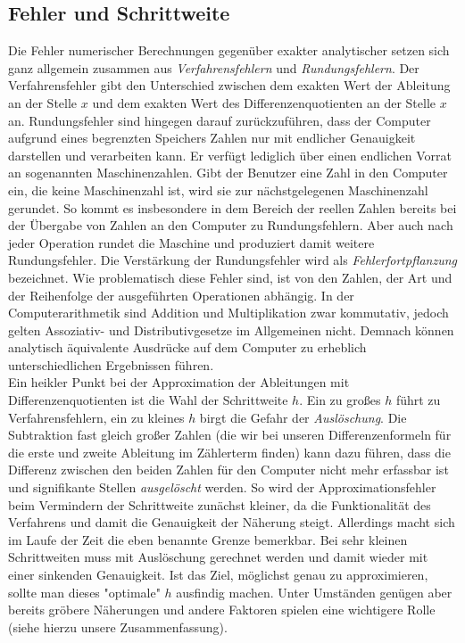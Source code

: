 \documentclass{scrartcl}
\begin{document}
\subsection{Fehler und Schrittweite}
\label{ssec:schrittweite}
Die Fehler numerischer Berechnungen gegenüber exakter analytischer setzen sich ganz allgemein zusammen aus \textit{Verfahrensfehlern} und \textit{Rundungsfehlern}. Der Verfahrensfehler gibt den Unterschied zwischen dem exakten Wert der Ableitung an der Stelle $x$ und dem exakten Wert des Differenzenquotienten an der Stelle $x$ an. Rundungsfehler sind hingegen darauf zurückzuführen, dass der Computer aufgrund eines begrenzten Speichers Zahlen nur mit endlicher Genauigkeit darstellen und verarbeiten kann. Er verfügt lediglich über einen endlichen Vorrat an sogenannten Maschinenzahlen. Gibt der Benutzer eine Zahl in den Computer ein, die keine Maschinenzahl ist, wird sie zur nächstgelegenen Maschinenzahl gerundet. So kommt es insbesondere in dem Bereich der reellen Zahlen bereits bei der Übergabe von Zahlen an den Computer zu Rundungsfehlern. Aber auch nach jeder Operation rundet die Maschine und produziert damit weitere Rundungsfehler. Die Verstärkung der Rundungsfehler wird als \textit{Fehlerfortpflanzung} bezeichnet. Wie problematisch diese Fehler sind, ist von den Zahlen, der Art und der Reihenfolge der ausgeführten Operationen abhängig. In der Computerarithmetik sind Addition und Multiplikation zwar kommutativ, jedoch gelten Assoziativ- und Distributivgesetze im Allgemeinen nicht. Demnach können analytisch äquivalente Ausdrücke auf dem Computer zu erheblich unterschiedlichen Ergebnissen führen. \\
Ein heikler Punkt bei der Approximation der Ableitungen mit Differenzenquotienten ist die Wahl der Schrittweite $h$. Ein zu großes $h$ führt zu Verfahrensfehlern, ein zu kleines $h$ birgt die Gefahr der \textit{Auslöschung}. Die Subtraktion fast gleich großer Zahlen (die wir bei unseren Differenzenformeln für die erste und zweite Ableitung im Zählerterm finden) kann dazu führen, dass die Differenz zwischen den beiden Zahlen für den Computer nicht mehr erfassbar ist und signifikante Stellen \textit{ausgelöscht} werden. So wird der Approximationsfehler beim Vermindern der Schrittweite zunächst kleiner, da die Funktionalität des Verfahrens und damit die Genauigkeit der Näherung steigt. Allerdings macht sich im Laufe der Zeit die eben benannte Grenze bemerkbar. Bei sehr kleinen Schrittweiten muss mit Auslöschung gerechnet werden und damit wieder mit einer sinkenden Genauigkeit. Ist das Ziel, möglichst genau zu approximieren, sollte man dieses "optimale" $h$ ausfindig machen. Unter Umständen genügen aber bereits gröbere Näherungen und andere Faktoren spielen eine wichtigere Rolle (siehe hierzu unsere Zusammenfassung). \\
\end{document}

